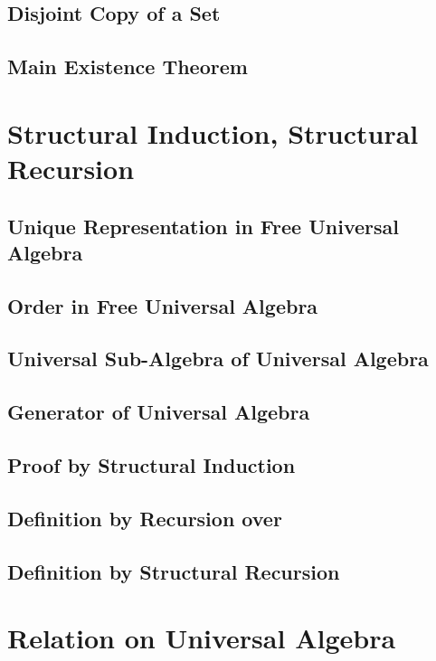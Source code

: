 \documentclass{report}
\begin{document}
    \subsection{Disjoint Copy of a Set}
      
    \subsection{Main Existence Theorem}
      
\section{Structural Induction, Structural Recursion}
    \subsection{Unique Representation in Free Universal Algebra}
      
    \subsection{Order in Free Universal Algebra}
      
    \subsection{Universal Sub-Algebra of Universal Algebra}
      
    \subsection{Generator of Universal Algebra}
      
    \subsection{Proof by Structural Induction}
      
    \subsection{Definition by Recursion over \texorpdfstring{\N}{N}}
      
    \subsection{Definition by Structural Recursion}
      
\section{Relation on Universal Algebra}
\end{document}
